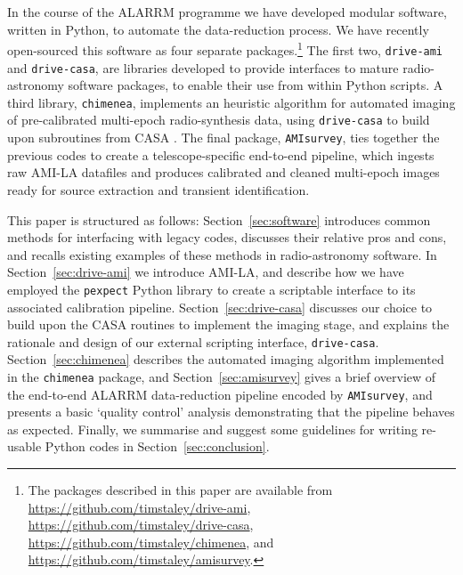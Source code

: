 \documentclass[5p,authoryear]{elsarticle}
\begin{document}
In the course of the ALARRM programme we have developed modular software, written in Python, to automate the data-reduction process. 
We have recently open-sourced this software as four separate packages.\footnote{%
The packages described in this paper are available from\\
\url{https://github.com/timstaley/drive-ami},\\
\url{https://github.com/timstaley/drive-casa},\\
\url{https://github.com/timstaley/chimenea}, and\\
\url{https://github.com/timstaley/amisurvey}.
}
The first two, \texttt{drive-ami} and \texttt{drive-casa}, are libraries developed to provide interfaces to mature radio-astronomy software packages, to enable their use from within Python scripts.
A third library, \texttt{chimenea}, implements an heuristic algorithm for automated imaging of pre-calibrated multi-epoch radio-synthesis data, using \texttt{drive-casa} to build upon subroutines from CASA \citep[the Common Astronomy Software Applications package,][]{McMullin2007, Casa2011}.
The final package, \texttt{AMIsurvey}, ties together the previous codes to create a telescope-specific end-to-end pipeline, which ingests raw AMI-LA datafiles and produces calibrated and cleaned multi-epoch images ready for source extraction and transient identification.

This paper is structured as follows: 
Section~\ref{sec:software} introduces common methods for 
interfacing with legacy codes, discusses their relative pros and cons, 
and recalls existing examples of these 
methods in radio-astronomy software. 
% 
In Section~\ref{sec:drive-ami} we introduce AMI-LA, and describe how we have employed the \texttt{pexpect} Python library to create a scriptable interface to its associated calibration pipeline.
% 
Section~\ref{sec:drive-casa} discusses our choice to build upon the CASA routines to implement the imaging stage, and explains the rationale and design of our external
scripting interface, \texttt{drive-casa}.
Section~\ref{sec:chimenea} describes the automated imaging algorithm implemented in the \texttt{chimenea} package, and Section~\ref{sec:amisurvey} gives a brief overview of the end-to-end ALARRM data-reduction pipeline encoded by \texttt{AMIsurvey}, and presents a basic `quality control' analysis demonstrating that the pipeline behaves as expected.
Finally, we summarise and suggest some guidelines for writing re-usable Python codes in Section~\ref{sec:conclusion}.
\end{document}
